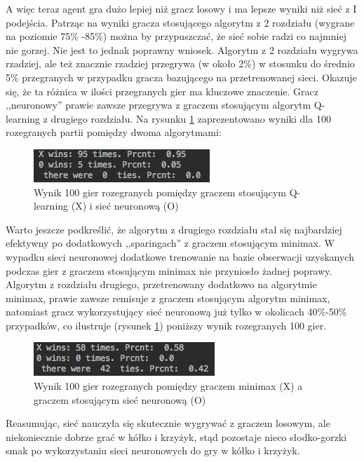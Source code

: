 \documentclass[licencjacka]{pracamgr}
\begin{document}
A więc teraz agent gra dużo lepiej niż gracz losowy i ma lepsze wyniki niż sieć z I podejścia. Patrząc na wyniki gracza stosującego algorytm z 2 rozdziału (wygrane na poziomie 75\% -85\%)   można by przypuszczać, że sieć sobie radzi co najmniej nie gorzej. Nie jest to jednak poprawny wniosek. Algorytm z 2 rozdziału wygrywa rzadziej, ale też znacznie rzadziej przegrywa (w około 2\%) w stosunku do średnio 5\% przegranych w przypadku gracza bazującego na przetrenowanej sieci. Okazuje się, że ta różnica w ilości przegranych gier ma kluczowe znaczenie. Gracz ,,neuronowy'' prawie zawsze  przegrywa z graczem stosującym algorytm Q-learning z drugiego rozdziału. Na rysunku \ref{Rys32} zaprezentowano wyniki dla 100 rozegranych partii pomiędzy dwoma algorytmami:

\begin{figure}[h!]
	\includegraphics [scale=0.8] {nn2_3.png}
	\caption{Wynik 100 gier rozegranych pomiędzy graczem stosującym Q-learning (X) i sieć neuronową (O)}
	\label{Rys32}
\end{figure} 

Warto jeszcze podkreślić, że algorytm z drugiego rozdziału stał się najbardziej efektywny po dodatkowych ,,sparingach'' z graczem  stosującym minimax. W wypadku sieci neuronowej dodatkowe trenowanie na bazie obserwacji uzyskanych podczas gier z graczem stosującym minimax nie przyniosło żadnej poprawy. Algorytm z rozdziału drugiego, przetrenowany dodatkowo na algorytmie minimax, prawie zawsze remisuje z graczem stosującym algorytm minimax, natomiast gracz wykorzystujący sieć neuronową już tylko w okolicach 40\%-50\% przypadków, co ilustruje (rysunek \ref{Rys32}) poniższy wynik rozegranych 100 gier.

\begin{figure}[h!]
	\includegraphics [scale=0.8] {nn2_4.png}
	\caption{Wynik 100 gier rozegranych pomiędzy graczem minimax (X) a graczem stosującym sieć neuronową (O)}
	\label{Rys33}
\end{figure} 

Reasumując, sieć nauczyła się skutecznie wygrywać z graczem losowym, ale niekoniecznie dobrze grać w kółko i krzyżyk, stąd pozostaje nieco słodko-gorzki smak po wykorzystaniu sieci neuronowych do gry w kółko i krzyżyk.\\
\end{document}
